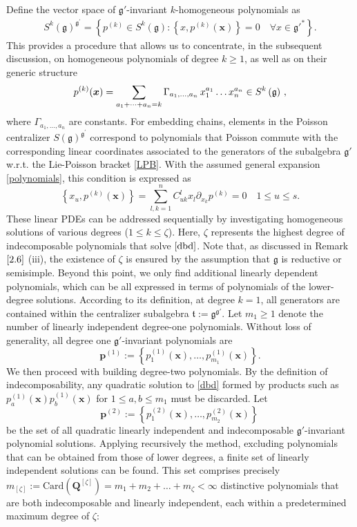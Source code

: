 \documentclass[10pt]{amsart}
\theoremstyle{definition}
\theoremstyle{corollary}
\theoremstyle{remark}
\theoremstyle{conclusion}
\begin{document}
Define the vector space of $\mathfrak{g}'$-invariant  $k$-homogeneous polynomials as 
\begin{align*}
S^k(\mathfrak{g})^{\mathfrak{g}^\prime}  = \left\{ p^{(k)} \in S^k(\mathfrak{g}): \left\{x,p^{(k)}(\boldsymbol{x})\right\} = 0  \quad \forall x \in {\mathfrak{g}'}^*\right\} .
\end{align*}  This provides a procedure that allows us to concentrate, in the subsequent discussion, on homogeneous polynomials of degree $k \geq 1$, as well as on their generic structure
\begin{equation}
	p^{(k)}(\boldsymbol{x})=\sum_{a_1+\dots + a_n = k} \Gamma_{a_1, \dots, a_n} \,x_1^{a_1} \dots x_n^{a_n}  \in S^k\left( \frak{g}\right) \,,
	\label{polynomials}
\end{equation} where $\Gamma_{a_1,\ldots,a_n}$  are constants.  For embedding chains, elements in the Poisson centralizer $S(\mathfrak{g})^{\mathfrak{g}^\prime}$ correspond to polynomials that Poisson commute with the corresponding linear coordinates associated to the generators of the subalgebra $\mathfrak{g}'$ w.r.t. the Lie-Poisson bracket \eqref{LPB}. With the assumed general expansion \eqref{polynomials}, this condition is expressed as 
\begin{equation}
	 \left\{x_u, p^{(k)}(\boldsymbol{x}) \right\}  =\sum_{ l,k=1}^n C_{uk}^lx_l%
	\partial_{x_k} p^{(k)}=0\quad 1\leq u \leq s.
	\label{dbd}
\end{equation}
These linear PDEs can be addressed sequentially by investigating homogeneous solutions of various degrees ($1 \leq k \leq \zeta$).  Here, $\zeta$ represents the highest degree of indecomposable polynomials that solve $\eqref{dbd}$. Note that, as discussed in Remark $\ref{2.6}$ (iii), the existence of $\zeta$ is ensured by the assumption that $\mathfrak{g}$ is reductive or semisimple. Beyond this point, we only find additional linearly dependent polynomials, which can be all expressed in terms of polynomials of the lower-degree solutions. According to its definition, at degree $k=1$, all generators are contained within the centralizer subalgebra $\mathfrak{t}:=\mathfrak{g}^{\mathfrak{g}'}$. Let $m_1 \geq 1$ denote the number of linearly independent degree-one polynomials. Without loss of generality, all degree one $\mathfrak{g}'$-invariant polynomials are  $$\boldsymbol{p}^{(1)}:=\left\{p_1^{(1)}(\boldsymbol{x}), \ldots, p_{m_1}^{(1)}(\boldsymbol{x})\right\}.$$ We then proceed with building degree-two polynomials. By the definition of indecomposability, any quadratic solution to \eqref{dbd} formed by products such as $p_a^{(1)}(\boldsymbol{x})p_b^{(1)}(\boldsymbol{x})$ for $1\leq a,b\leq m_1$ must be discarded. Let $$\boldsymbol{p}^{(2)}:=\left\{p_1^{(2)}(\boldsymbol{x}), \ldots, p_{m_2}^{(2)}(\boldsymbol{x})\right\} \, $$ be the set of all quadratic linearly independent and indecomposable $\mathfrak{g}'$-invariant polynomial solutions.  Applying recursively the method, excluding polynomials that can be obtained from those of lower degrees, a finite set of linearly independent solutions can be found. This set comprises precisely $m_{[\zeta]}:=\text{Card}(\boldsymbol{Q}^{[\zeta]})=m_1+m_2+\ldots +m_\zeta < \infty$ distinctive polynomials that are both indecomposable and linearly independent, each within a predetermined maximum degree of $\zeta$:
\end{document}
